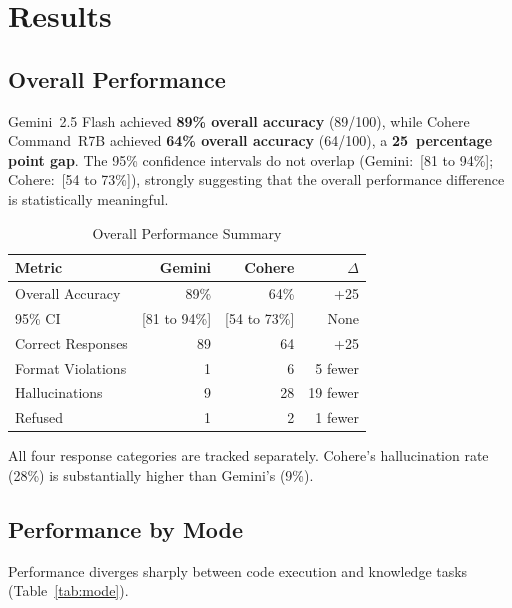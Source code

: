 \documentclass[12pt,a4paper]{article}
\begin{document}
\section{Results}

\subsection{Overall Performance}

Gemini~2.5 Flash achieved \textbf{89\% overall accuracy} (89/100), while Cohere Command~R7B achieved \textbf{64\% overall accuracy} (64/100), a \textbf{25~percentage point gap}. The 95\% confidence intervals do not overlap (Gemini:~[81 to 94\%]; Cohere:~[54 to 73\%]), strongly suggesting that the overall performance difference is statistically meaningful.

\begin{table}[ht]
\centering
\caption{Overall Performance Summary}
\label{tab:overall}
\begin{tabular}{l r r r}
\toprule
\textbf{Metric} & \textbf{Gemini} & \textbf{Cohere} & \textbf{$\Delta$} \\
\midrule
Overall Accuracy       & 89\% & 64\% & +25 \\
95\% CI                & [81 to 94\%] & [54 to 73\%] & None \\
Correct Responses      & 89  & 64  & +25 \\
Format Violations      & 1   & 6   & 5 fewer \\
Hallucinations         & 9   & 28  & 19 fewer \\
Refused                & 1   & 2   & 1 fewer \\
\bottomrule
\end{tabular}

\smallskip
\footnotesize All four response categories are tracked separately. Cohere's hallucination rate (28\%) is substantially higher than Gemini's (9\%).
\end{table}

\subsection{Performance by Mode}

Performance diverges sharply between code execution and knowledge tasks (Table~\ref{tab:mode}).
\end{document}

